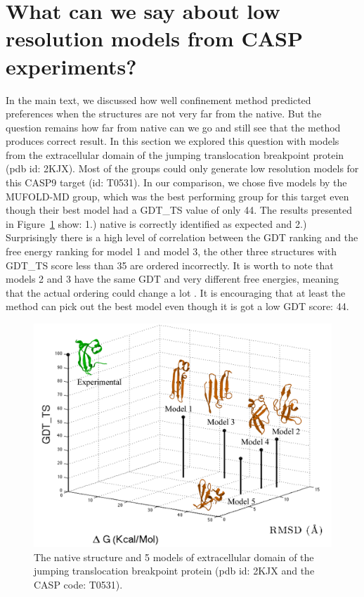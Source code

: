 \documentclass[12pt]{article}
\begin{document}
\section*{What can we say about low resolution models from CASP experiments?}

In the main text, we discussed how well confinement method predicted preferences when the structures are not very far from the
native. But the question remains how far from native can we go and still see that the method produces correct result. In
this section we explored this question with models from the extracellular domain of the jumping translocation breakpoint
protein (pdb id: 2KJX). Most of the groups could only generate low resolution models for this CASP9 target (id: T0531).
In our comparison, we chose five models by the MUFOLD-MD group, which was the best performing group for this target
even though their best model had a GDT\_TS value of only 44. The results presented in Figure~\ref{fig:T0531} show: 1.) native is
correctly identified as expected and 2.) Surprisingly there is a high level of correlation between the GDT ranking and
the free energy ranking for model 1 and model 3, the other three structures with GDT\_TS score less than 35  are ordered
incorrectly. It is worth to note that models 2 and 3 have the same GDT and very different free energies, meaning that
the actual ordering could change a lot \cite{Perez2012}. It is encouraging that at least the method can pick out the
best model even though it is got a low GDT score: 44.

\begin{figure}
\begin{center}
\includegraphics[width=3.5 in]{T0531.pdf}
\end{center}
\caption{The native structure and 5 models of extracellular domain of the jumping translocation breakpoint protein (pdb
    id: 2KJX and the CASP code: T0531).}
\label{fig:T0531}
\end{figure}
\end{document}
